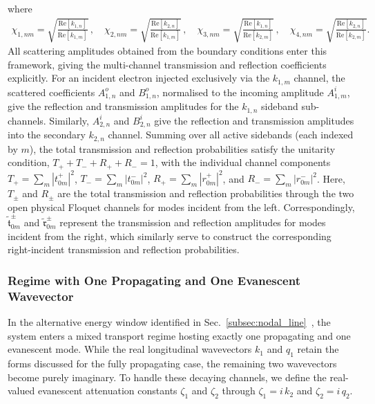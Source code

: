 \documentclass[aps,prb,onecolumn,longbibliography,nofootinbib,citeautoscript,10pt]{revtex4-2}
\begin{document}
where 
\begin{align}
\chi_{1,nm} = \sqrt{\frac{\text{Re}[k_{1,n}]} {\text{Re}[k_{1,m}]}} \,,  \quad
\chi_{2,nm} = \sqrt{\frac{\text{Re}[k_{2,n}]} {\text{Re}[k_{1,m}]}} \,,  \quad
\chi_{3,nm} = \sqrt{\frac{\text{Re}[k_{1,n}]} {\text{Re}[k_{2,m}]}} \,,  \quad 
\chi_{4,nm} = \sqrt{\frac{\text{Re}[k_{2,n}]} {\text{Re}[k_{2,m}]}}.
\end{align}
All scattering amplitudes obtained from the boundary conditions enter this framework, giving the multi-channel transmission and reflection coefficients explicitly. For an incident electron injected exclusively via the $k_{1,m}$ channel, the scattered coefficients $A_{1,n}^{o}$ and $B_{1,n}^{o}$, normalised to the incoming amplitude $A_{1,m}^{i}$, give the reflection and transmission amplitudes for the $k_{1,n}$ sideband sub-channels. Similarly, $A_{2,n}^{i}$ and $B_{2,n}^{i}$ give the reflection and transmission amplitudes into the secondary $k_{2,n}$ channel. Summing over all active sidebands (each indexed by $m$), the total transmission and reflection  probabilities satisfy the unitarity condition, $T_{+} + T_{-} + R_{+} + R_{-} = 1$,  with the individual channel components $T_{+} = \sum_m |t_{0m}^{+}|^2$,  $T_{-} = \sum_m |t_{0m}^{-}|^2$, $R_{+} = \sum_m |r_{0m}^{+}|^2$, and  $R_{-} = \sum_m |r_{0m}^{-}|^2$. Here, $T_{\pm}$ and $R_{\pm}$ are the total  transmission and reflection probabilities through the two open physical Floquet  channels for modes incident from the left. Correspondingly, $\tilde{\mathfrak{t}}^{\pm}_{0m}$ and $\tilde{\mathfrak{r}}^{\pm}_{0m}$ represent the transmission and reflection amplitudes for modes incident from the right, which similarly serve to construct the corresponding right-incident transmission and reflection probabilities.


\subsubsection{Regime with One Propagating and One Evanescent Wavevector}\label{subsubsec:one_propagating_one_evanescent}
In the alternative energy window identified in Sec.~\ref{subsec:nodal_line} \,,  the system enters a mixed transport regime hosting exactly one propagating and one evanescent mode. While the real longitudinal wavevectors $k_1$ and $q_1$ retain the forms discussed for the fully propagating case, the remaining two wavevectors become purely imaginary. To handle these decaying channels, we define the real-valued evanescent attenuation constants $\zeta_1$ and $\zeta_2$ through $\zeta_1 =  i\, k_2$ and $\zeta_2 = i \,q_2$.
\end{document}
